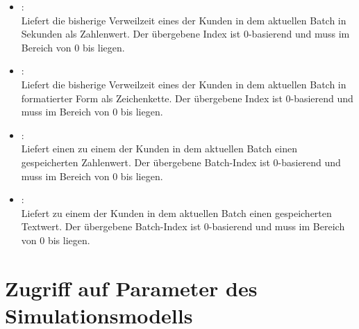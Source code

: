 \begin{itemize}
\item
{}:\\
Liefert die bisherige Verweilzeit eines der Kunden in dem aktuellen Batch in Sekunden als Zahlenwert.
Der übergebene Index ist 0-basierend und muss im Bereich von 0 bis  liegen.

\item
{}:\\
Liefert die bisherige Verweilzeit eines der Kunden in dem aktuellen Batch in formatierter Form als Zeichenkette.
Der übergebene Index ist 0-basierend und muss im Bereich von 0 bis  liegen.

\item
{}:\\
Liefert einen zu einem der Kunden in dem aktuellen Batch einen gespeicherten Zahlenwert.
Der übergebene Batch-Index ist 0-basierend und muss im Bereich von 0 bis  liegen.

\item
{}:\\
Liefert zu einem der Kunden in dem aktuellen Batch einen gespeicherten Textwert.
Der übergebene Batch-Index ist 0-basierend und muss im Bereich von 0 bis  liegen.

\end{itemize}

\section{Zugriff auf Parameter des Simulationsmodells}

